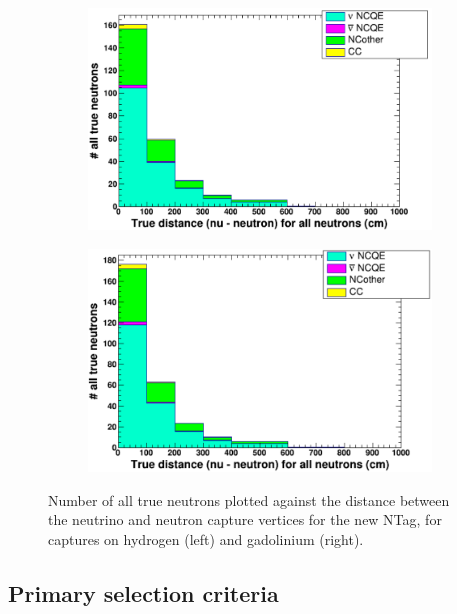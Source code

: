 \begin{figure}
    \centering
     \begin{subfigure}[b]{0.49\linewidth}
      \includegraphics[width=\linewidth]{Figures/TruCapNuNDistanceReductionNewH.PNG}
     \end{subfigure}
     \begin{subfigure}[b]{0.49\linewidth}
       \includegraphics[width=\linewidth]{Figures/TruCapNuNDistanceReductionNewGd.PNG}
      \end{subfigure} 
      \caption{Number of all true neutrons plotted against the distance between the neutrino and neutron capture vertices for the new NTag, for captures on hydrogen (left) and gadolinium (right).}
      \label{fig:TruCapNuNDistanceReductionNewHGd} 
\end{figure}

\subsection{Primary selection criteria}

